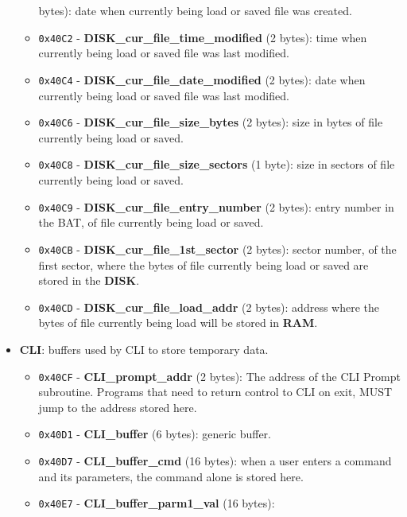 \begin{itemize}
\begin{itemize}
                bytes): date when currently being load or saved file was created.
                \item \texttt{0x40C2} - \textbf{DISK\_cur\_file\_time\_modified} (2
                bytes): time when currently being load or saved file was last modified.
                \item \texttt{0x40C4} - \textbf{DISK\_cur\_file\_date\_modified} (2
                bytes): date when currently being load or saved file was last modified.
                \item \texttt{0x40C6} - \textbf{DISK\_cur\_file\_size\_bytes} (2
                bytes): size in bytes of file currently being load or saved.
                \item \texttt{0x40C8} - \textbf{DISK\_cur\_file\_size\_sectors} (1
                byte): size in sectors of file currently being load or saved.
                \item \texttt{0x40C9} - \textbf{DISK\_cur\_file\_entry\_number} (2
                bytes): entry number in the BAT, of file currently being load or
                saved.
                \item \texttt{0x40CB} - \textbf{DISK\_cur\_file\_1st\_sector} (2
                bytes): sector number, of the first sector, where the bytes of file
                currently being load or saved are stored in the \textbf{DISK}.
                \item \texttt{0x40CD} - \textbf{DISK\_cur\_file\_load\_addr} (2
                bytes): address where the bytes of file currently being load will be
                stored in \textbf{RAM}.
            \end{itemize}
            \item \textbf{CLI}: buffers used by CLI to store temporary data.
            \begin{itemize}
                \item \texttt{0x40CF} - \textbf{CLI\_prompt\_addr} (2 bytes): The
                address of the CLI Prompt subroutine. Programs that need to return
                control to CLI on exit, MUST jump to the address stored here.
                \item \texttt{0x40D1} - \textbf{CLI\_buffer} (6 bytes): generic
                buffer.
                \item \texttt{0x40D7} - \textbf{CLI\_buffer\_cmd} (16 bytes): when a
                user enters a command and its parameters, the command alone is
                stored here.
                \item \texttt{0x40E7} - \textbf{CLI\_buffer\_parm1\_val} (16 bytes):

\end{itemize}
\end{itemize}
